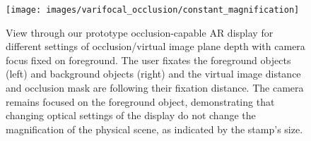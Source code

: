\begin{figure}[htpb!]
\centering
\texttt{[image: images/varifocal\_occlusion/constant\_magnification]}
\caption[Varifocal-Occlusion NED: Constant real-world magnification independent of virtual image plane distance]{View through our prototype occlusion-capable AR display for different settings of occlusion/virtual image plane depth with camera focus fixed on foreground. The user fixates the foreground objects (left) and background objects (right) and the virtual image distance and occlusion mask are following their fixation distance. The camera remains focused on the foreground object, demonstrating that changing optical settings of the display do not change the magnification of the physical scene, as indicated by the stamp's size. }
\label{fig:varifocal_occlusion:constant_magnification}
\end{figure}
